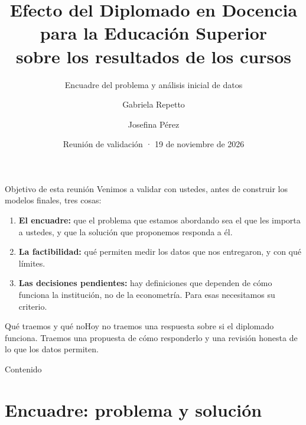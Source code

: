 \documentclass[10pt,aspectratio=169]{beamer}
\title[Efecto del diplomado: encuadre y datos]{Efecto del Diplomado en Docencia para la Educación Superior\\ sobre los resultados de los cursos}
\subtitle{Encuadre del problema y análisis inicial de datos}
\author[G. Repetto y J. Pérez]{Gabriela Repetto \and Josefina Pérez}
\institute[ICS3564]{ICS3564 Econometría Avanzada\\ Pontificia Universidad Católica de Chile}
\date[19 nov 2026]{Reunión de validación · 19 de noviembre de 2026}
\newcommand{\sintesis}[2]{%
  \begin{block}{#1}#2\end{block}}
\begin{document}
\begin{frame}
  \titlepage
\end{frame}

\begin{frame}{Objetivo de esta reunión}
  Venimos a validar con ustedes, \alert{antes de construir los modelos finales}, tres cosas:
  \vspace{0.6em}
  \begin{enumerate}
    \item \textbf{El encuadre:} que el problema que estamos abordando sea el que les importa a ustedes, y que la solución que proponemos responda a él.
    \item \textbf{La factibilidad:} qué permiten medir los datos que nos entregaron, y con qué límites.
    \item \textbf{Las decisiones pendientes:} hay definiciones que dependen de cómo funciona la institución, no de la econometría. Para esas necesitamos su criterio.
  \end{enumerate}
  \vspace{0.6em}
  \sintesis{Qué traemos y qué no}{Hoy no traemos una respuesta sobre si el diplomado funciona. Traemos una propuesta de cómo responderlo y una revisión honesta de lo que los datos permiten.}
\end{frame}

\begin{frame}{Contenido}
  \tableofcontents
\end{frame}

\section{Encuadre: problema y solución}
\end{document}
